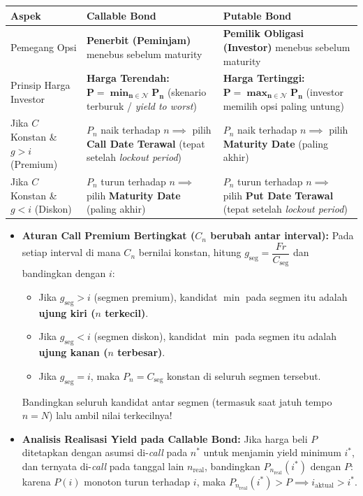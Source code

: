 \documentclass[10pt,a4paper]{article}
\begin{document}
\begin{rumusbox}
\begin{center}
\small
\renewcommand{\arraystretch}{1.28}
\begin{tabular}{@{}p{3.4cm}p{6.5cm}p{6.5cm}@{}}
\toprule
\textbf{Aspek} & \textbf{Callable Bond} & \textbf{Putable Bond} \\
\midrule
Pemegang Opsi & \textbf{Penerbit (Peminjam)} menebus sebelum maturity & \textbf{Pemilik Obligasi (Investor)} menebus sebelum maturity \\
Prinsip Harga Investor & \textbf{Harga Terendah:} $\mathbf{P = \min_{n \in \mathcal{N}} P_n}$ (skenario terburuk / \textit{yield to worst}) & \textbf{Harga Tertinggi:} $\mathbf{P = \max_{n \in \mathcal{N}} P_n}$ (investor memilih opsi paling untung) \\
Jika $C$ Konstan \& $g > i$ (Premium) & $P_n$ naik terhadap $n \implies$ pilih \textbf{Call Date Terawal} (tepat setelah \textit{lockout period}) & $P_n$ naik terhadap $n \implies$ pilih \textbf{Maturity Date} (paling akhir) \\
Jika $C$ Konstan \& $g < i$ (Diskon) & $P_n$ turun terhadap $n \implies$ pilih \textbf{Maturity Date} (paling akhir) & $P_n$ turun terhadap $n \implies$ pilih \textbf{Put Date Terawal} (tepat setelah \textit{lockout period}) \\
\bottomrule
\end{tabular}
\end{center}
\begin{itemize}[leftmargin=1.5em, topsep=1pt, itemsep=1.5pt]
    \item \textbf{Aturan Call Premium Bertingkat ($C_n$ berubah antar interval):}
    Pada setiap interval di mana $C_n$ bernilai konstan, hitung $g_{\text{seg}} = \dfrac{Fr}{C_{\text{seg}}}$ dan bandingkan dengan $i$:
    \begin{itemize}[leftmargin=1.2em, topsep=0.5pt, itemsep=1pt]
        \item Jika $g_{\text{seg}} > i$ (segmen premium), kandidat $\min$ pada segmen itu adalah \textbf{ujung kiri ($n$ terkecil)}.
        \item Jika $g_{\text{seg}} < i$ (segmen diskon), kandidat $\min$ pada segmen itu adalah \textbf{ujung kanan ($n$ terbesar)}.
        \item Jika $g_{\text{seg}} = i$, maka $P_n = C_{\text{seg}}$ konstan di seluruh segmen tersebut.
    \end{itemize}
    Bandingkan seluruh kandidat antar segmen (termasuk saat jatuh tempo $n=N$) lalu ambil nilai terkecilnya!
    \item \textbf{Analisis Realisasi Yield pada Callable Bond:} Jika harga beli $P$ ditetapkan dengan asumsi di-\textit{call} pada $n^*$ untuk menjamin yield minimum $i^*$, dan ternyata di-\textit{call} pada tanggal lain $n_{\text{real}}$, bandingkan $P_{n_{\text{real}}}(i^*)$ dengan $P$: karena $P(i)$ monoton turun terhadap $i$, maka $P_{n_{\text{real}}}(i^*) > P \implies i_{\text{aktual}} > i^*$.
\end{itemize}
\end{rumusbox}
\end{document}
